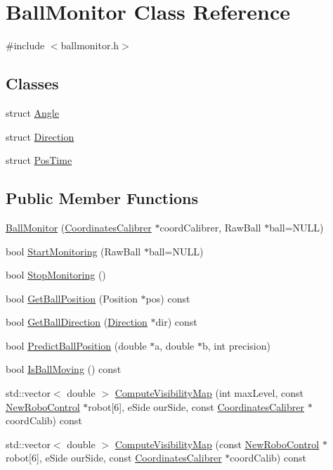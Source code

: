 \hypertarget{classBallMonitor}{
\section{BallMonitor Class Reference}
\label{classBallMonitor}
}


{\ttfamily \#include $<$ballmonitor.h$>$}

\subsection*{Classes}
\begin{DoxyCompactItemize}
\item 
struct \hyperlink{structBallMonitor_1_1Angle}{Angle}
\item 
struct \hyperlink{structBallMonitor_1_1Direction}{Direction}
\item 
struct \hyperlink{structBallMonitor_1_1PosTime}{PosTime}
\end{DoxyCompactItemize}
\subsection*{Public Member Functions}
\begin{DoxyCompactItemize}
\item 
\hyperlink{classBallMonitor_a176a257973eefa572b6972aa6b5a605d}{BallMonitor} (\hyperlink{classCoordinatesCalibrer}{CoordinatesCalibrer} $\ast$coordCalibrer, RawBall $\ast$ball=NULL)
\item 
bool \hyperlink{classBallMonitor_a4d2b3aa764f5d4f4d5f58b7530565f90}{StartMonitoring} (RawBall $\ast$ball=NULL)
\item 
bool \hyperlink{classBallMonitor_af71db12abeb1f10f7be58eb7591910a3}{StopMonitoring} ()
\item 
bool \hyperlink{classBallMonitor_aab81815271c442087c15bc8f6843d092}{GetBallPosition} (Position $\ast$pos) const 
\item 
bool \hyperlink{classBallMonitor_a3cd2fe1ed297c468634fbb390ca088bd}{GetBallDirection} (\hyperlink{structBallMonitor_1_1Direction}{Direction} $\ast$dir) const 
\item 
bool \hyperlink{classBallMonitor_a914053314023ea79ee691a3031e355bf}{PredictBallPosition} (double $\ast$a, double $\ast$b, int precision)
\item 
bool \hyperlink{classBallMonitor_a8995e71b82d80987984dd6b1ed89c0a0}{IsBallMoving} () const 
\item 
std::vector$<$ double $>$ \hyperlink{classBallMonitor_aad046acf9df6b0381ab3b1b8351e97c5}{ComputeVisibilityMap} (int maxLevel, const \hyperlink{classNewRoboControl}{NewRoboControl} $\ast$robot\mbox{[}6\mbox{]}, eSide ourSide, const \hyperlink{classCoordinatesCalibrer}{CoordinatesCalibrer} $\ast$coordCalib) const 
\item 
std::vector$<$ double $>$ \hyperlink{classBallMonitor_ac30119e22cfe4814670c4eae8c6b5495}{ComputeVisibilityMap} (const \hyperlink{classNewRoboControl}{NewRoboControl} $\ast$robot\mbox{[}6\mbox{]}, eSide ourSide, const \hyperlink{classCoordinatesCalibrer}{CoordinatesCalibrer} $\ast$coordCalib) const 
\end{DoxyCompactItemize}
